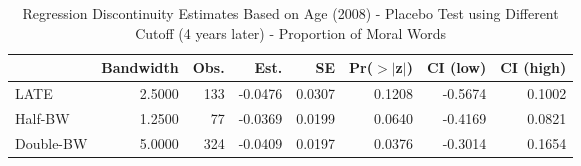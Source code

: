 \begin{table}[ht]
\centering
\begin{tabular}{lrrrrrrr}
  \hline
 & Bandwidth & Obs. & Est. & SE & Pr($>$$|$z$|$) & CI (low) & CI (high) \\ 
  \hline
LATE & 2.5000 & 133 & -0.0476 & 0.0307 & 0.1208 & -0.5674 & 0.1002 \\ 
  Half-BW & 1.2500 & 77 & -0.0369 & 0.0199 & 0.0640 & -0.4169 & 0.0821 \\ 
  Double-BW & 5.0000 & 324 & -0.0409 & 0.0197 & 0.0376 & -0.3014 & 0.1654 \\ 
   \hline
\end{tabular}
\caption{Regression Discontinuity Estimates Based on Age (2008) - Placebo Test using Different Cutoff (4 years later) - Proportion of Moral Words} 
\label{tab:Xrd2008y_plac}
\end{table}
